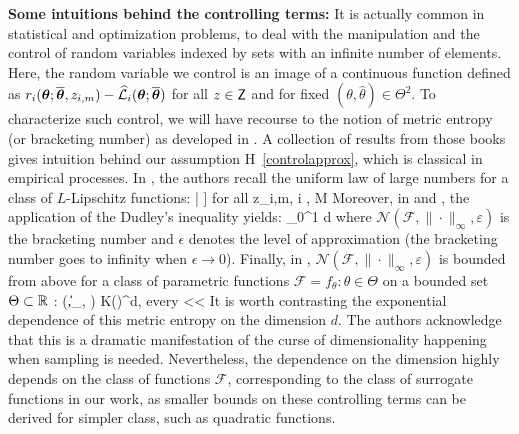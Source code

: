 \documentclass[11pt]{article}
\theoremstyle{t}
\begin{document}
\textbf{Some intuitions behind the controlling terms:} It is actually common in statistical and optimization problems, to deal with the manipulation and the control of random variables indexed by sets with an infinite number of elements. Here, the random variable we control is an image of a continuous function defined as $r_i (\param ; \op, z_{i,m})  - \sur{i}{\param}{\op}$ for all $z \in \Zset$ and for fixed $(\theta, \hat{\theta}) \in \Theta^2$.
To characterize such control, we will have recourse to the notion of metric entropy (or bracketing number) as developed in \citep{van2000asymptotic, vershynin2018high, wainwright2019high}.
A collection of results from those books gives intuition behind our assumption H~\ref{controlapprox}, which is classical in empirical processes.
In \citep[Theorem 8.2.3]{vershynin2018high}, the authors recall the uniform law of large numbers for a class of $L$-Lipschitz functions:
\beq
\EE \left[\underset{f \in \mathcal{F}}{ \sup } \left|\frac{1}{M} \sum_{i=1}^{M} f\left(z_{i,m}\right)-\EE[f(z_i)]\right| \right] \leq {} \quad \textrm{for all} \quad z_{i,m}, i \in {}, M \rrbracket
\eeq
Moreover, in \citep[Theorem 8.1.3 ]{vershynin2018high} and \citep[Theorem 5.22]{wainwright2019high}, the application of the Dudley's inequality yields:
\beq
\EE {} \leq {} \int_{0}^{1}  d \varepsilon
\eeq
where $\mathcal{N}\left(\mathcal{F},\|\cdot\|_{\infty}, \varepsilon\right)$ is the bracketing number and $\epsilon$ denotes the level of approximation (the bracketing number goes to infinity when $\epsilon  \to 0$). Finally, in \citep[p.271, Example]{van2000asymptotic}, $\mathcal{N}\left(\mathcal{F},\|\cdot\|_{\infty}, \varepsilon\right)$ is bounded from above for a class of parametric functions $ \mathcal{F}= {f_{\theta}: \theta \in \Theta}$ on a bounded set $\Theta \subset \rset$ :
\beq
{}\left(,\|\cdot\|_{\infty}, \varepsilon\right) \leq K\left(\right)^{d}, \quad \textrm{every} <\varepsilon< \Theta
\eeq
It is worth contrasting the exponential dependence of this metric entropy on the dimension $d$. 
The authors acknowledge that this is a dramatic manifestation of the curse of dimensionality happening when sampling is needed.
Nevertheless, the dependence on the dimension highly depends on the class of functions $\mathcal{F}$, corresponding to the class of surrogate functions in our work, as smaller bounds on these controlling terms can be derived for simpler class, such as quadratic functions.
\end{document}
